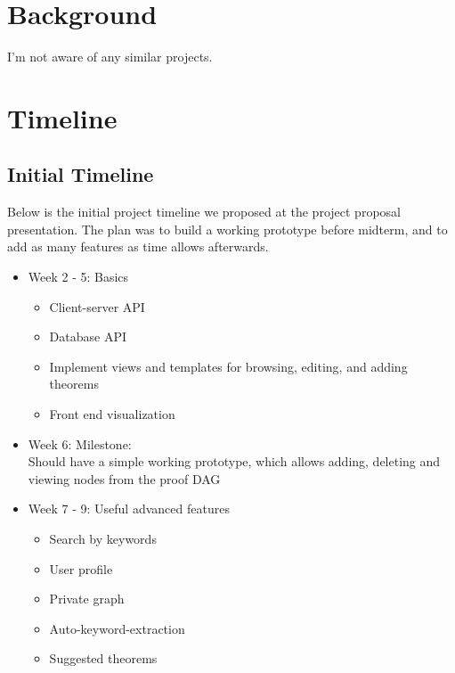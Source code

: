 \documentclass{acm_proc_article-sp}
\begin{document}
\section{Background}
I'm not aware of any similar projects.

\section{Timeline}
\subsection{Initial Timeline}
Below is the initial project timeline we proposed at the project proposal presentation. The plan was to build a working prototype before midterm, and to add as many features as time allows afterwards.  
\begin{itemize}
\item Week 2 - 5: Basics
\begin{itemize}
\item Client-server API
\item Database API
\item Implement views and templates for browsing, editing, and adding theorems
\item Front end visualization
\end{itemize}
\item Week 6: Milestone:\\
Should have a simple working prototype, which allows adding, deleting and viewing nodes from the proof DAG
\item Week 7 - 9: Useful advanced features
\begin{itemize}
\item Search by keywords
\item User profile
\item Private graph
\item Auto-keyword-extraction
\item Suggested theorems
\end{itemize}
\end{itemize}
\end{document}
